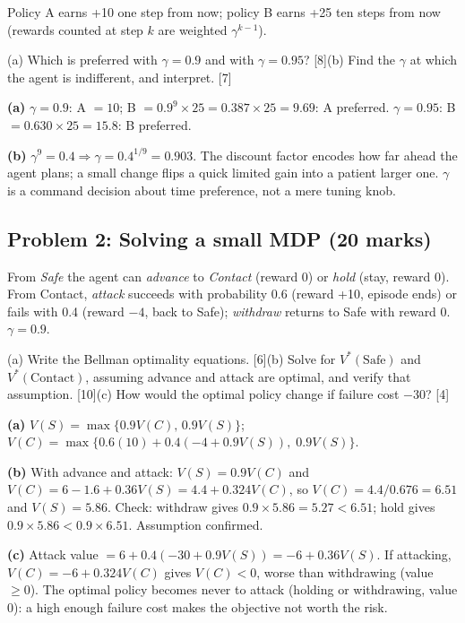 \documentclass[11pt]{article}
\begin{document}
\begin{prob}Policy A earns +10 one step from now; policy B earns +25 ten steps from now (rewards counted at step $k$ are weighted $\gamma^{k-1}$).

(a) Which is preferred with $\gamma=0.9$ and with $\gamma=0.95$? [8]\newline (b) Find the $\gamma$ at which the agent is indifferent, and interpret. [7]\end{prob}

\begin{soln}\textbf{(a)} $\gamma=0.9$: A $=10$; B $=0.9^9\times25=0.387\times25=9.69$: A preferred. $\gamma=0.95$: B $=0.630\times25=15.8$: B preferred.

\textbf{(b)} $\gamma^9=0.4\Rightarrow\gamma=0.4^{1/9}=\mathbf{0.903}$. The discount factor encodes how far ahead the agent plans; a small change flips a quick limited gain into a patient larger one. $\gamma$ is a command decision about time preference, not a mere tuning knob.\end{soln}

\subsection{Problem 2: Solving a small MDP \normalfont\small\color{GreyN}(20 marks)}

\begin{prob}From \textit{Safe} the agent can \textit{advance} to \textit{Contact} (reward 0) or \textit{hold} (stay, reward 0). From Contact, \textit{attack} succeeds with probability 0.6 (reward +10, episode ends) or fails with 0.4 (reward $-4$, back to Safe); \textit{withdraw} returns to Safe with reward 0. $\gamma=0.9$.

(a) Write the Bellman optimality equations. [6]\newline (b) Solve for $V^*(\text{Safe})$ and $V^*(\text{Contact})$, assuming advance and attack are optimal, and verify that assumption. [10]\newline (c) How would the optimal policy change if failure cost $-30$? [4]\end{prob}

\begin{soln}\textbf{(a)} $V(S)=\max\{0.9V(C),\,0.9V(S)\}$; $V(C)=\max\{0.6(10)+0.4(-4+0.9V(S)),\;0.9V(S)\}$.

\textbf{(b)} With advance and attack: $V(S)=0.9V(C)$ and $V(C)=6-1.6+0.36V(S)=4.4+0.324V(C)$, so $V(C)=4.4/0.676=\mathbf{6.51}$ and $V(S)=\mathbf{5.86}$. Check: withdraw gives $0.9\times5.86=5.27<6.51$; hold gives $0.9\times5.86<0.9\times6.51$. Assumption confirmed.

\textbf{(c)} Attack value $=6+0.4(-30+0.9V(S))=-6+0.36V(S)$. If attacking, $V(C)=-6+0.324V(C)$ gives $V(C)<0$, worse than withdrawing (value $\ge0$). The optimal policy becomes never to attack (holding or withdrawing, value 0): a high enough failure cost makes the objective not worth the risk.\end{soln}
\end{document}
